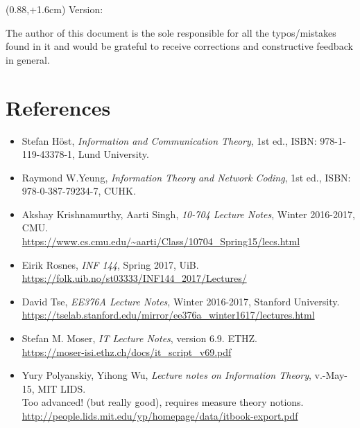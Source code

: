 \documentclass[10pt]{homework}
\newcommand\PlaceText[3]{%
\begin{textblock*}{10in}(#1,#2)  %
#3
\end{textblock*}
}%
\begin{document}
\PlaceText{0.88\textwidth}{\voffset+1.6cm}{Version: \texttt{\detokenize{2023_06_03_0}}}
\mysetupheader
The author of this document is the sole responsible for all the typos/mistakes found in it and would be grateful to receive corrections and constructive feedback in general.
\\[-20pt]
\section*{References}
\begin{itemize}
    \item
    Stefan Höst, \emph{Information and Communication Theory}, 1st ed., ISBN: 978-1-119-43378-1, Lund University.


    \item Raymond W.\@ Yeung, \emph{Information Theory and Network Coding}, 1st ed., ISBN: 978-0-387-79234-7, CUHK.

    \item
    Akshay Krishnamurthy, Aarti Singh, \emph{10-704 Lecture Notes}, Winter 2016-2017, CMU.
    \\
    \url{https://www.cs.cmu.edu/~aarti/Class/10704_Spring15/lecs.html}

    \item
    Eirik Rosnes, \emph{INF 144}, Spring 2017, UiB.
    \\
    \url{https://folk.uib.no/st03333/INF144_2017/Lectures/}

    \item
    David Tse, \emph{EE376A Lecture Notes}, Winter 2016-2017, Stanford University.
    \\
    \url{https://tselab.stanford.edu/mirror/ee376a_winter1617/lectures.html}

    \item
    Stefan M. Moser, \emph{IT Lecture Notes}, version 6.9. ETHZ.
    \\
    \url{https://moser-isi.ethz.ch/docs/it_script_v69.pdf}




    \item
    Yury Polyanskiy, Yihong Wu, \emph{Lecture notes on Information Theory}, v.\@{}-May-15, MIT LIDS.
    \\
    Too advanced! (but really good), requires measure theory notions.\\
    \url{http://people.lids.mit.edu/yp/homepage/data/itbook-export.pdf}
\end{itemize}
\end{document}
